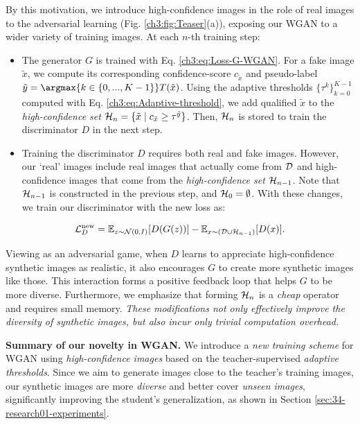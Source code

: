 \begin{foldable}
    By this motivation, we introduce high-confidence images in the role of real images to the adversarial learning (Fig. \ref{ch3:fig:Teaser}(a)), exposing our WGAN to a wider variety of training images.
    At each $n$-th training step:
\end{foldable}
\begin{itemize}
    \item The generator $G$ is trained with Eq. \ref{ch3:eq:Loss-G-WGAN}. For a fake image $\tilde{x}$, we compute its corresponding confidence-score $c_{\tilde{x}}$ and pseudo-label $\tilde{y}=\argmax{k\in\{0,...,K-1\}}T(\tilde{x})$. Using the adaptive thresholds $\{\tau^{k}\}_{k=0}^{K-1}$ computed with Eq. \ref{ch3:eq:Adaptive-threshold}, we add qualified $\tilde{x}$ to the \textit{high-confidence set} ${\cal H}_{n}=\{\tilde{x}\mid c_{\tilde{x}}\geq\tau^{\tilde{y}}\}$. Then, ${\cal H}_{n}$ is stored to train the discriminator $D$ in the next step.
    \item Training the discriminator $D$ requires both real and fake images. However, our `real' images include real images that actually come from ${\cal D}$ and high-confidence images that come from the \textit{high-confidence set} ${\cal H}_{n-1}$. Note that ${\cal H}_{n-1}$ is constructed in the previous step, and ${\cal H}_{0}=\emptyset$. With these changes, we train our discriminator with the new loss as:
\end{itemize}

\begin{equation}
    \mathcal{L}_{D}^{\textnormal{new}}=\mathbb{E}_{z\sim{\cal N}(0,I)}[D(G(z))]-\mathbb{E}_{x\sim\left({\cal D}\cup{\cal H}_{n-1}\right)}[D(x)].\label{ch3:eq:Loss-D-DivBFKD}
\end{equation}

\begin{foldable}
    Viewing as an adversarial game, when $D$ learns to appreciate high-confidence synthetic images as realistic, it also encourages $G$ to create more synthetic images like those.
    This interaction forms a positive feedback loop that helps $G$ to be more diverse.
    Furthermore, we emphasize that forming ${\cal H}_{n}$ is a \textit{cheap} operator and requires small memory.
    \textit{These modifications not only effectively improve the diversity of synthetic images, but also incur only trivial computation overhead.}
\end{foldable}

\begin{foldable}
    \textbf{Summary of our novelty in WGAN.} We introduce a \textit{new training scheme} for WGAN using \textit{high-confidence images} based on the teacher-supervised \textit{adaptive thresholds}.
    Since we aim to generate images close to the teacher's training images, our synthetic images are more \textit{diverse} and better cover \textit{unseen images}, significantly improving the student's generalization, as shown in Section \ref{sec:34-research01-experiments}.
\end{foldable}

